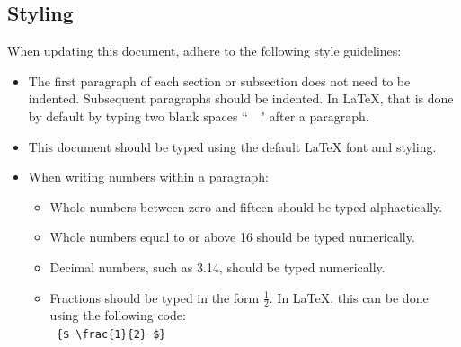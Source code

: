 \documentclass{scrreprt}
\begin{document}
\subsection{Styling}
When updating this document, adhere to the following style guidelines:
\begin{itemize}
    \item The first paragraph of each section or subsection does not need to be indented.
          Subsequent paragraphs should be indented.
          In \gls{LaTeX}, that is done by default by typing two blank spaces ``\ \ " after a paragraph.
    \item This document should be typed using the default \gls{LaTeX} font and styling.
    \item When writing numbers within a paragraph:
          \begin{itemize}
              \item Whole numbers between zero and fifteen should be typed alphaetically.
              \item Whole numbers equal to or above 16 should be typed numerically.
              \item Decimal numbers, such as 3.14, should be typed numerically.
              \item Fractions should be typed in the form {$\frac{1}{2}$}.
                    In \gls{LaTeX}, this can be done using the following code:
                    \\ \texttt{ \{\$ \textbackslash frac\{1\}\{2\} \$\} }
          \end{itemize}
\end{itemize}
\end{document}
